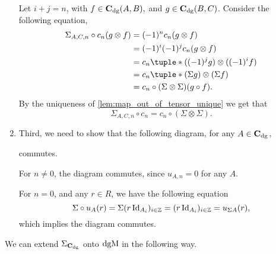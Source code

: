 \begin{remark}
\begin{enumerate}
{            Let \( i + j = n \), with \( f \in \operatorname{\mathbf{C}}_{\operatorname{dg}}(A, B), \) and \( g \in \operatorname{\mathbf{C}}_{\operatorname{dg}}(B, C) \). Consider the following equation,
            \begin{align*}
                \Sigma_{A, C, n} \circ c_n (g \otimes f) &= (-1)^n c_n (g \otimes f) \\
                &= (-1)^i (-1)^j c_n (g \otimes f) \\
                &= c_n\tuple*{((-1)^j g) \otimes ((-1)^i f)} \\
                &= c_n\tuple*{(\Sigma g) \otimes (\Sigma f)} \\
                &= c_n \circ (\Sigma \otimes \Sigma) (g \circ f).
            \end{align*}
            By the uniqueness of \autoref{lem:map_out_of_tensor_unique} we get that
            \[
                \Sigma_{A, C, n} \circ c_n = c_n \circ (\Sigma \otimes \Sigma).
            \]
        }
        \item {
            Third, we need to show that the following diagram, for any \( A \in \operatorname{\mathbf{C}}_{\operatorname{dg}} \),
            \begin{center}
            \end{center}
            commutes.

            For \( n \neq 0 \), the diagram commutes, since \( u_{A, n} = 0 \) for any \( A \).

            For \( n = 0 \), and any \( r \in R \), we have the following equation
            \[
                \Sigma \circ u_A (r) = \Sigma (r \operatorname{Id}_{A_i})_{i \in {\mathbb{Z}}} = (r \operatorname{Id}_{A_i})_{i \in {\mathbb{Z}}} = u_{\Sigma A} (r),
            \]
            which implies the diagram commutes.
        }
    \end{enumerate}
\end{remark}

We can extend \( \Sigma_{\operatorname{\mathbf{C}}_{\operatorname{dg}}} \) onto \( \operatorname{dgM} \) in the following way.

